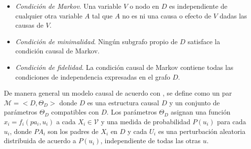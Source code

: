 \begin{itemize}
    \item \textit{Condición de Markov}. Una variable $V$ o nodo
    en $D$ es independiente de cualquier otra variable $A$ tal que
    $A$ no es ni una causa o efecto de $V$ dadas las causas de $V$.
    \item \textit{Condición de minimalidad}. Ningún subgrafo propio de $D$ satisface la condición causal de Markov.
    \item \textit{Condición de fidelidad}. La condición causal de Markov contiene todas las condiciones de independencia expresadas en el grafo $D$.
\end{itemize}



De manera general un modelo causal de acuerdo con \cite{pearl_2009}, se define como un par $\mathcal{M} = <D, \Theta_D>$ donde $D$
es una estructura causal 
$D$ y un conjunto de 
parámetros $\Theta_D$ compatibles con $D$. Los 
parámetros $\Theta_D$ asignan una función $x_i = f_i (pa_i, u_i)$ a cada $X_i \in\mathcal{V}$
y una medida de  probabilidad  $P(u_i)$ para cada $u_i$, donde $PA_i$ son 
los padres de $X_i$ en $D$ y cada $U_i$ es una perturbación aleatoria distribuida
de acuerdo a $P(u_i)$, independiente de todas las otras $u$.
    


